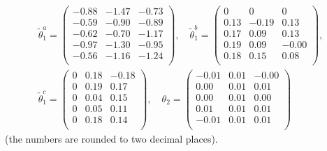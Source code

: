 \begin{gather*}
  \tilde{\theta}_{1}^{a} = \left(%
    \begin{smallmatrix}
      -0.88  &-1.47&  -0.73 \\
      -0.59& -0.90&  -0.89\\
      -0.62  &-0.70&   -1.17 \\
      -0.97  &-1.30   &-0.95\\
       -0.56 &-1.16& -1.24 \\
           \end{smallmatrix}\right), \quad
         \tilde{\theta}_{1}^{b} = \left(%
    \begin{smallmatrix}
      0 & 0 & 0  \\
      0.13 & -0.19 &  0.13\\
      0.17 &  0.09 &  0.13\\
      0.19 & 0.09 &-0.00  \\
      0.18 &  0.15 &  0.08\\
           \end{smallmatrix}\right), \\
         \tilde{\theta}_{1}^{c} = \left(%
    \begin{smallmatrix}
      0 &0.18& -0.18\\
      0 &0.19 & 0.17\\
      0 & 0.04  &0.15\\
      0 & 0.05&  0.11\\
      0 & 0.18  &0.14\\
           \end{smallmatrix}\right),\quad
         \theta_{2} = \left(%
    \begin{smallmatrix}
-0.01  &0.01& -0.00 \\ 
  0.00   & 0.01 & 0.01\\
  0.00    &0.01&  0.00  \\
  0.01 & 0.01 & 0.01\\
 -0.01 & 0.01&  0.01\\
           \end{smallmatrix}\right)
\end{gather*}
(the numbers are rounded to two decimal places). 


